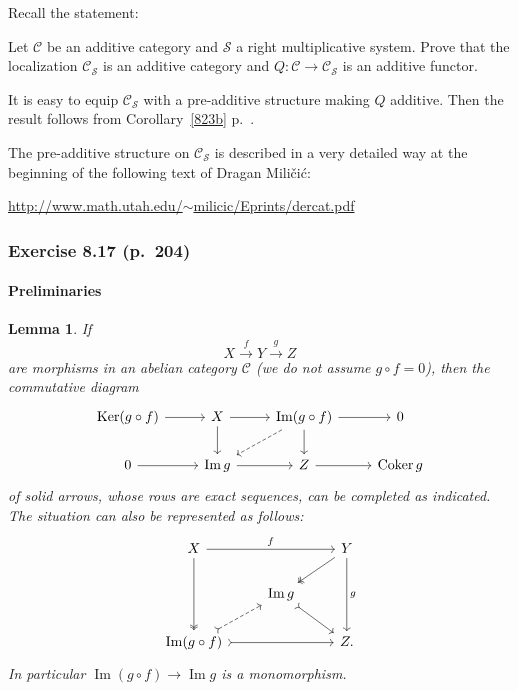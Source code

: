 \documentclass[12pt]{article}
\newtheorem{lem}[thm]{Lemma}
\theoremstyle{remark}
\theoremstyle{definition}
\newcommand{\cc}{\mathcal}
\newcommand{\C}{\mathcal C}
\newcommand{\xr}{\xrightarrow}
\DeclareMathOperator{\Coker}{Coker}
\DeclareMathOperator{\Ima}{Im}
\DeclareMathOperator{\Ker}{Ker}
\begin{document}
Recall the statement: 

Let $\C$ be an additive category and $\cc S$ a right multiplicative system. Prove that the localization $\C_{\cc S}$ is an additive category and $Q:\C\to\C_{\cc S}$ is an additive functor. 

It is easy to equip $\C_{\cc S}$ with a pre-additive structure making $Q$ additive. Then the result follows from Corollary~\ref{823b} p.~\pageref{823b}. 

The pre-additive structure on $\C_{\cc S}$ is described in a very detailed way at the beginning of the following text of Dragan Mili\v{c}i\'c:  
%
\begin{center}\href{http://www.math.utah.edu/~milicic/Eprints/dercat.pdf}{http://www.math.utah.edu/$\sim$milicic/Eprints/dercat.pdf}
\end{center} 


\subsubsection{Exercise 8.17 (p.~204)}\label{817} 

\paragraph{Preliminaries} 

\begin{lem} 
If  
%
\begin{equation}\label{e817}
X\xr fY\xr gZ 
\end{equation}
% 
are morphisms in an abelian category $\C$ (we do not assume $g\circ f=0$), then the commutative diagram 
$$
\begin{tikzcd}
\Ker(g\circ f)\ar{r}&X\ar{d}\ar{r}&\Ima(g\circ f)\ar[dashed]{dl}\ar{d}\ar{r}&0\\ 
0\ar{r}&\Ima g\ar{r}&Z\ar{r}&\Coker g
\end{tikzcd}
$$ 
of solid arrows, whose rows are exact sequences, can be completed as indicated. The situation can also be represented as follows: 
$$
\begin{tikzcd}
X\ar[two heads]{dd}\ar{rr}{f}&&Y\ar[two heads]{dl}\ar{dd}{g}\\ 
{}&\Ima g\ar[tail]{dr}\\ 
\Ima(g\circ f)\ar[dashed,tail]{ur}\ar[tail]{rr}&&Z.
\end{tikzcd}
$$ 
In particular $\Ima(g\circ f)\to\Ima g$ is a monomorphism. 
\end{lem} 
\end{document}
